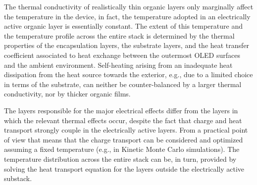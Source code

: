 \documentclass[%
9pt,
 aip,
rsi,%
 amsmath,amssymb,
preprint,%
]{revtex4-1}
\begin{document}
The thermal conductivity of realistically thin organic layers only marginally affect the temperature in the device, in fact, the temperature adopted in an electrically active organic layer is essentially constant. 
The extent of this temperature and the temperature profile across the entire stack is determined by the thermal properties of the encapsulation layers, the substrate layers, and the heat transfer coefficient associated to heat exchange between the outermost OLED surfaces and the ambient environment.
Self-heating arising from an inadequate heat dissipation from the heat source towards the exterior, e.g., due to a limited choice in terms of the substrate, can neither be counter-balanced by a larger thermal conductivity, nor by thicker organic films. 

The layers responsible for the major electrical effects differ from the layers in which the relevant thermal effects occur, despite the fact that charge and heat transport strongly couple in the electrically active layers. 
From a practical point of view that means that the charge transport can be considered and optimized assuming a fixed temperature (e.g., in Kinetic Monte Carlo simulations). The temperature distribution across the entire stack can be, in turn, provided by solving the heat transport equation for the layers outside the electrically active substack.

\end{document}
